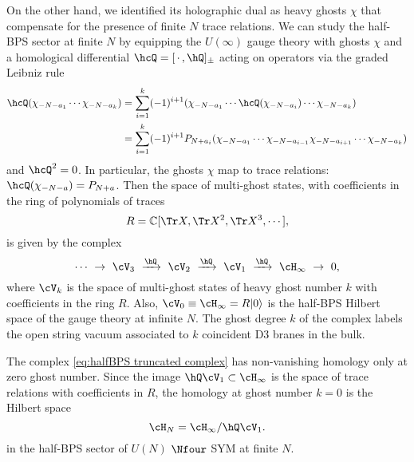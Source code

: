 \documentclass[a4paper,12pt]{article}
\begin{document}
On the other hand, we identified its holographic dual as heavy ghosts $\chi$ that compensate for the presence of finite $N$ trace relations. We can study the half-BPS sector at finite $N$ by equipping the $U(\infty)$ gauge theory with ghosts $\chi$ and a homological differential $\hcQ = [\, \cdot \, , \hQ]_\pm$ acting on operators via the graded Leibniz rule
\begin{align}
    \hcQ ( \chi_{-N-a_1} \cdots \chi_{-N-a_k}) &= \sum_{i=1}^{k} (-1)^{i+1} ( \chi_{-N-a_1} \cdots \hcQ(\chi_{-N-a_i}) \cdots \chi_{-N-a_k} ) \nonumber \\
    &= \sum_{i=1}^{k} (-1)^{i+1} P_{N+a_i} ( \chi_{-N-a_1} \cdots \chi_{-N-a_{i-1}} \chi_{-N-a_{i+1}} \cdots \chi_{-N-a_k} )
\end{align}
and $\hcQ^2 = 0$. In particular, the ghosts $\chi$ map to trace relations: $\hcQ (\chi_{-N-a}) = P_{N+a}$. Then the space of multi-ghost states, with coefficients in the ring of polynomials of traces
\begin{equation}
R = \mathbb{C}[\Tr X, \Tr X^2, \Tr X^3, \cdots ],
\end{equation}
is given by the complex
\begin{equation} \label{eq:halfBPS truncated complex}
\cdots \ \rightarrow \ \cV_3 \ \xrightarrow{\hQ} \ \cV_2 \ \xrightarrow{\hQ} \ \cV_1 \ \xrightarrow{\hQ} \ \cH_\infty \ \rightarrow \ 0,
\end{equation}
where $\cV_k$ is the space of multi-ghost states of heavy ghost number $k$ with coefficients in the ring $R$. Also, $\cV_0 \equiv \cH_\infty = R | 0 \rangle$ is the half-BPS Hilbert space of the gauge theory at infinite $N$. The ghost degree $k$ of the complex labels the open string vacuum associated to $k$ coincident D3 branes in the bulk.

The complex \eqref{eq:halfBPS truncated complex} has non-vanishing homology only at zero ghost number. Since the image $\hQ \cV_1 \subset \cH_\infty$ is the space of trace relations with coefficients in $R$, the homology at ghost number $k=0$ is the Hilbert space
\begin{equation}
\cH_N = \cH_\infty / \hQ \cV_1.
\end{equation}
in the half-BPS sector of $U(N)$ $\Nfour$ SYM at finite $N$.
\end{document}
